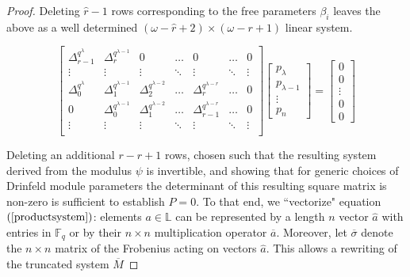 \documentclass[sigconf]{acmart}
\newcommand{\F}{\mathbb{F}}
\renewcommand{\L}{\mathbb{L}}
\newcommand{\hatr}{\hat{r}}
\newcommand{\reduc}{\lambda}
\begin{document}
\begin{proof}
Deleting $\hatr - 1$ rows corresponding to the free parameters $\beta_i$ leaves the above as a well determined $ (\omega - \hatr + 2) \times (\omega - r + 1)$ linear system. 

\begin{equation}
    \label{reduced}
    \begin{bmatrix}
    \Delta_{r - 1}^{q^{\reduc}} & \Delta_{r}^{q^{\reduc - 1}} & 0 & \ldots & 0 & \ldots & 0 \\
    \vdots & \vdots & \vdots & \ddots & \vdots & \ddots & \vdots \\
    \Delta_{0}^{q^{\reduc}} & \Delta_{1}^{q^{\reduc - 1}} & \Delta_{2}^{q^{\reduc - 2}} & \ldots & \Delta_{r}^{q^{\reduc - r}} & \ldots & 0 \\
    0 & \Delta_{0}^{q^{\reduc - 1}} & \Delta_{1}^{q^{\reduc - 2}} & \ldots & \Delta_{r-1}^{q^{\lambda - r}} & \ldots & 0 \\
    \vdots & \vdots & \vdots & \ddots & \vdots & \ddots & \vdots \\
    
    
    \end{bmatrix}
    \begin{bmatrix}
    p_{\reduc} \\ p_{\reduc - 1} \\ \vdots \\ p_{n}
    \end{bmatrix}
    = 
    \begin{bmatrix}
    0 \\ 0 \\ \vdots \\ 0 \\ 0
    \end{bmatrix}
\end{equation}

Deleting an additional $r - \hatr + 1$ rows, chosen such that the resulting system derived from the modulus $\psi$ is invertible, and showing that for generic choices of Drinfeld module parameters the determinant of this resulting square matrix is non-zero is sufficient to establish $P = 0$. To that end, we ``vectorize" equation $(\ref{productsystem})$: elements $a \in \L$ can be represented by a length $n$ vector $\hat{a}$ with entries in $\F_q$ or by their $n\times n$ multiplication operator $\overline{a}$. Moreover, let $\overline{\sigma}$ denote the $n\times n$ matrix of the Frobenius acting on vectors $\hat{a}$. This allows a rewriting of the truncated system $\overline{M}$


\end{proof}
\end{document}
